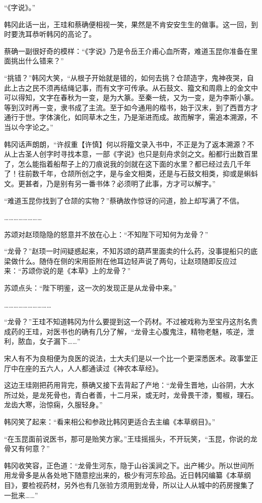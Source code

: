 “《字说》。”

韩冈此话一出，王珪和蔡确便相视一笑，果然是不肯安安生生的做事。这一回，到时要洗耳恭听韩冈的高论了。

蔡确一副很好奇的模样：“《字说》乃是令岳王介甫心血所寄，难道玉昆你准备在里面挑出什么错来？”

“挑错？”韩冈大笑，“从根子开始就是错的，如何去挑？仓颉造字，鬼神夜哭，自此上古之民不须再结绳记事，而有文字可传承。从石鼓文、籀文和周鼎上的金文中可以得知，文字在春秋为一变，是为大篆。至秦一统，又为一变，是为李斯小篆。等到汉时再一变，隶书成了主流。至于如今通用的楷书，始于汉末，到了西晋方才通行于世。字体演化，如同草木之生，乃是渐进而成。故而解字，需追本溯源，不当以今字论之。”

韩冈话声朗朗，“许叔重【许慎】何以将籀文录入书中，不正是为了返本溯源？不从上古圣人创字时寻找本意，一部《字说》也只是刻舟求剑之文。船都行出数百里了，怎么能指着船帮子上的刀痕说我的剑就在这下面的水里？都已经过去几千年了！往前数千年，仓颉所创之字，是与金文相类，还是与石鼓文相类，抑或是蝌蚪文。更甚者，乃是别有另一番书体？必须明了此事，方才可以解字。”

“难道玉昆你找到了仓颉的实物？”蔡确故作惊讶的问道，脸上却写满了不信。

……………………

苏颂对赵顼隐隐的怒意并不放在心上：“不知陛下可知何为龙骨？”

“龙骨？”赵顼一时间疑惑起来，不知苏颂的葫芦里面卖的什么药，没事提船只的底梁做什么。随侍在侧的宋用臣附在他耳边轻声说了两句，让赵顼随即反应过来：“苏颂你说的是《本草》上的龙骨？”

苏颂点头：“陛下明鉴，这一次的发现正是从龙骨中来。”

…………………………

“龙骨？”王珪不知道韩冈为什么要提到这一个药材。不过被戏称为至宝丹这剂名贵成药的王珪，对医书也的确有几分了解，“龙骨主心腹鬼注，精物老魅，咳逆，泄利，脓血，女子漏下……”

宋人有不为良相便为良医的说法，士大夫们是以一个比一个更深悉医术。政事堂正厅中在座的五六人，人人都通读过《神农本草经》。

这边王珪刚把药用背完，蔡确又接下去背起了产地：“龙骨生晋地，山谷阴，大水所过处，是龙死骨也，青白者善，十二月采，或无时，龙骨畏干漆，蜀椒，理石。龙齿大寒，治惊痫，久服轻身。”

韩冈笑了起来：“看来相公和参政比韩冈更适合去主编《本草纲目》。”

“在玉昆面前说医书，那可是贻笑方家。”王珪摇摇头，不开玩笑，“玉昆，你说的龙骨又有何意？”

韩冈收笑容，正色道：“龙骨生河东，隐于山谷溪涧之下。出产稀少。所以世间所用龙骨多是从各处地下随意挖出来的，极少有河东珍品。近日韩冈编纂《本草纲目》，要检视药材，另外也有几张验方须用到龙骨，所以让人从城中的药房搜集了一批来……”

